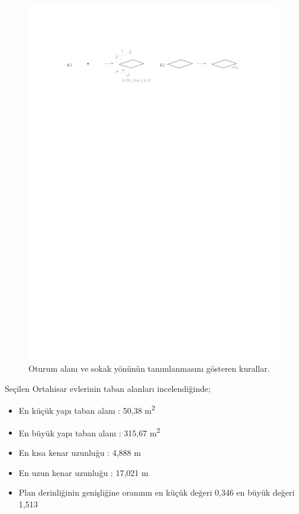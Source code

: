 \documentclass[12pt,turkish,a4paperpaper,]{report}
\providecommand{\tightlist}{%
  \setlength{\itemsep}{0pt}\setlength{\parskip}{0pt}}
\begin{document}
\begin{figure}
\centering
\includegraphics[width=1\textwidth,height=\textheight]{source/figures/K1-K2.pdf}
\caption{Oturum alanı ve sokak yönünün tanımlanmasını gösteren kurallar.
\label{K1K2}}
\end{figure}

Seçilen Ortahisar evlerinin taban alanları incelendiğinde;

\begin{itemize}
\tightlist
\item
  En küçük yapı taban alanı : 50,38 m\textsuperscript{2}
\item
  En büyük yapı taban alanı : 315,67 m\textsuperscript{2}
\item
  En kısa kenar uzunluğu : 4,888 m
\item
  En uzun kenar uzunluğu : 17,021 m
\item
  Plan derinliğinin genişliğine oranının en küçük değeri 0,346 en büyük
  değeri 1,513
\end{itemize}
\end{document}
